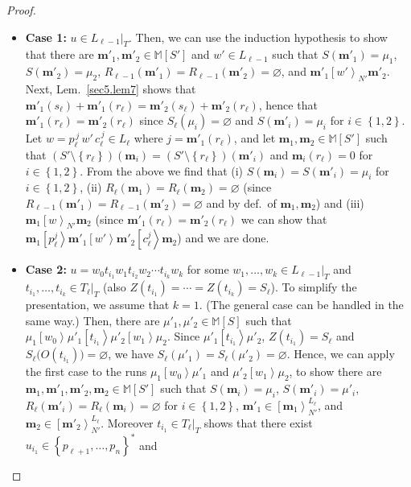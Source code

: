 \documentclass{fsttcs}
\def\set#1{{\left\{ #1 \right\}}}
\newcommand{\multiset}[1]{{\mathbb{M}[ #1 ]}}
\def\mmap{\mathbf{m}}
\newcommand{\fire}[1]{\left[ {#1}\right\rangle}
\begin{document}
\begin{proof}
\begin{itemize}
\item {\bf Case 1:} $u \in L_{\ell-1}|_T$. Then, we can use the induction
  hypothesis to show that there are $\mmap'_1, \mmap'_2 \in \multiset{S'}$ and
  $w' \in L_{\ell-1}$  such that $S(\mmap'_1)=\mu_1$, $S(\mmap'_2)=\mu_2$,
  $R_{\ell-1}(\mmap'_1)=R_{\ell-1}(\mmap'_2)=\varnothing$, and
  $\mmap'_1\fire{w'}_{N'}\mmap'_{2}$. 
  Next, Lem.~\ref{sec5.lem7} shows that
  \(\mmap'_1(s_{\ell})+\mmap'_1(r_{\ell})=\mmap'_2(s_{\ell})+\mmap'_2(r_{\ell})\),
  hence that \(\mmap'_1(r_{\ell})=\mmap'_2(r_{\ell})\) since
  \(S_{\ell}(\mu_i)=\varnothing\) and \(S(\mmap'_{i})=\mu_i\) for
  \(i\in\set{1,2}\). 
  Let  $w= p_{\ell}^{\, j}\,  w' \,
  c_{\ell}^{\, j}\in L_{\ell}$ where $j= \mmap'_1(r_\ell)$,
  and let \(\mmap_1, \mmap_2\in\multiset{S'}\) such that $(S'\setminus\set{r_{\ell}})(\mmap_i)=(S'\setminus\set{r_{\ell}})(\mmap'_i)$ and \(\mmap_i(r_{\ell})=0\) for \(i\in\set{1,2}\).
  From the above we find that (i) \(S(\mmap_i)=S(\mmap'_i)=\mu_i\)  for
  \(i\in\set{1,2}\), (ii) \(R_{\ell}(\mmap_1)=R_{\ell}(\mmap_2)=\varnothing\) (since \(R_{\ell-1}(\mmap'_1)=R_{\ell-1}(\mmap'_2)=\varnothing\) and by def.\ of \(\mmap_1,\mmap_2\)) and
  (iii) \(\mmap_1\fire{w}_{N'}\mmap_2\) (since \(\mmap'_1(r_{\ell})=\mmap'_2(r_{\ell})\)
  we can show that \(\mmap_1\fire{p_{\ell}^{j}}\mmap'_1\fire{w'}\mmap'_2\fire{c_{\ell}^{j}}\mmap_2\)) and we are done.
\item {\bf Case 2:} $u=w_0 t_{i_1} w_1 t_{i_2} w_2 \cdots t_{i_{k}} w_k$ for
  some  $w_1,\ldots,w_k  \in L_{\ell-1}|_T$ and $t_{i_1}, \ldots, t_{i_k}\in T_{\ell}|_T$ 
  (also $Z(t_{i_1})=\cdots=Z(t_{i_k})=S_{\ell}$).
  To simplify the presentation, we assume  that $k=1$. (The general case
  can be handled in the same way.)  Then, there are $\mu'_1, \mu'_2 \in
  \multiset{S}$ such that $\mu_1  \fire{w_0}  \mu'_1  \fire{t_{i_1}}  \mu'_2
  \fire{w_1} \mu_2$. Since $\mu'_1  \fire{t_{i_1}}  \mu'_2 $, \(Z(t_{i_1})=S_{\ell}\) and
  $S_{\ell}\bigl(O(t_{i_1})\bigr)=\varnothing$, we have
  $S_{\ell}(\mu'_1)=S_{\ell}(\mu'_2)=\varnothing$. Hence, we can apply the
  first case to the runs $\mu_1  \fire{w_0}  \mu'_1$  and  $\mu'_2 \fire{w_1}
  \mu_2$, to show there are $\mmap_1, \mmap'_1,\mmap'_2, \mmap_2 \in
  \multiset{S'}$ such that $S(\mmap_i)=\mu_i$, 
  $S(\mmap'_i)=\mu'_i$, 
  \(R_{\ell}(\mmap'_i)=R_{\ell}(\mmap_i)=\varnothing\)
  for \(i\in\set{1,2}\), 
  $\mmap'_1 \in \fire{\mmap_{1}}^{L_\ell}_{N'}$, and $\mmap_2 \in
  \fire{\mmap'_{2}}^{L_\ell}_{N'}$. 
Moreover \(t_{i_1}\in T_{\ell}|_T\) shows that
  there exist \(u_{i_1}\in\set{p_{\ell+1},\ldots,p_n}^*\) and 

\end{itemize}
\end{proof}
\end{document}
